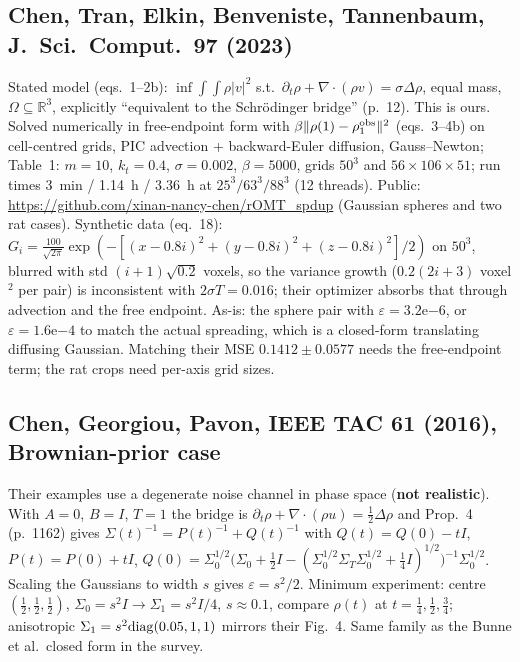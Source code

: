 \documentclass[11pt]{article}
\newcommand{\eps}{\varepsilon}
\newcommand{\R}{\mathbb{R}}
\newcommand{\dv}{\nabla\cdot}
\newcommand{\no}{\textcolor{BrickRed}{\textbf{not realistic}}}
\begin{document}
\subsection{Chen, Tran, Elkin, Benveniste, Tannenbaum, J.\ Sci.\ Comput.\ 97 (2023)}
Stated model (eqs.~1--2b): $\inf\int\!\int\rho|v|^2$ s.t.\ $\partial_t\rho+\dv(\rho v)=\sigma\Delta\rho$, equal mass, $\Omega\subseteq\R^3$, explicitly ``equivalent to the Schr\"odinger bridge'' (p.~12). This is ours. Solved numerically in free-endpoint form with $\beta\|\rho(1)-\rho_1^{\rm obs}\|^2$ (eqs.~3--4b) on cell-centred grids, PIC advection + backward-Euler diffusion, Gauss--Newton; Table~1: $m=10$, $k_t=0.4$, $\sigma=0.002$, $\beta=5000$, grids $50^3$ and $56\times106\times51$; run times 3~min / 1.14~h / 3.36~h at $25^3/63^3/88^3$ (12 threads). Public: \url{https://github.com/xinan-nancy-chen/rOMT_spdup} (Gaussian spheres and two rat cases). Synthetic data (eq.~18): $G_i=\tfrac{100}{\sqrt{2\pi}}\exp(-[(x-0.8i)^2+(y-0.8i)^2+(z-0.8i)^2]/2)$ on $50^3$, blurred with std $(i+1)\sqrt{0.2}$ voxels, so the variance growth ($0.2(2i+3)$ voxel$^2$ per pair) is inconsistent with $2\sigma T=0.016$; their optimizer absorbs that through advection and the free endpoint. As-is: the sphere pair with $\eps=3.2$e$-6$, or $\eps=1.6$e$-4$ to match the actual spreading, which is a closed-form translating diffusing Gaussian. Matching their MSE $0.1412\pm0.0577$ needs the free-endpoint term; the rat crops need per-axis grid sizes.

\subsection{Chen, Georgiou, Pavon, IEEE TAC 61 (2016), Brownian-prior case}
Their examples use a degenerate noise channel in phase space (\no). With $A=0$, $B=I$, $T=1$ the bridge is $\partial_t\rho+\dv(\rho u)=\tfrac12\Delta\rho$ and Prop.~4 (p.~1162) gives $\Sigma(t)^{-1}=P(t)^{-1}+Q(t)^{-1}$ with $Q(t)=Q(0)-tI$, $P(t)=P(0)+tI$, $Q(0)=\Sigma_0^{1/2}\bigl(\Sigma_0+\tfrac12I-(\Sigma_0^{1/2}\Sigma_T\Sigma_0^{1/2}+\tfrac14I)^{1/2}\bigr)^{-1}\Sigma_0^{1/2}$. Scaling the Gaussians to width $s$ gives $\eps=s^2/2$. Minimum experiment: centre $(\tfrac12,\tfrac12,\tfrac12)$, $\Sigma_0=s^2I\to\Sigma_1=s^2I/4$, $s\approx0.1$, compare $\rho(t)$ at $t=\tfrac14,\tfrac12,\tfrac34$; anisotropic $\Sigma_1=s^2{\rm diag}(0.05,1,1)$ mirrors their Fig.~4. Same family as the Bunne et al.\ closed form in the survey.
\end{document}
